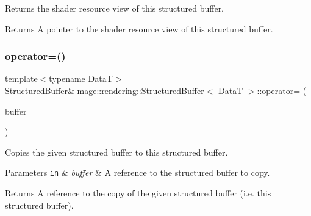 Returns the shader resource view of this structured buffer.

\begin{DoxyReturn}{Returns}
A pointer to the shader resource view of this structured buffer. 
\end{DoxyReturn}
\mbox{\label{classmage_1_1rendering_1_1_structured_buffer_a87a27778bf6097f84b63acc0eef49a3a}} 
\subsubsection{\texorpdfstring{operator=()}{operator=()}\hspace{0.1cm}{\footnotesize\ttfamily [1/2]}}
{\footnotesize\ttfamily template$<$typename DataT$>$ \\
\mbox{\hyperlink{classmage_1_1rendering_1_1_structured_buffer}{Structured\+Buffer}}\& \mbox{\hyperlink{classmage_1_1rendering_1_1_structured_buffer}{mage\+::rendering\+::\+Structured\+Buffer}}$<$ DataT $>$\+::operator= (\begin{DoxyParamCaption}\item[{const \mbox{\hyperlink{classmage_1_1rendering_1_1_structured_buffer}{Structured\+Buffer}}$<$ DataT $>$ \&}]{buffer }\end{DoxyParamCaption})\hspace{0.3cm}{\ttfamily [delete]}}

Copies the given structured buffer to this structured buffer.


\begin{DoxyParams}[1]{Parameters}
\mbox{\tt in}  & {\em buffer} & A reference to the structured buffer to copy. \\
\hline
\end{DoxyParams}
\begin{DoxyReturn}{Returns}
A reference to the copy of the given structured buffer (i.\+e. this structured buffer). 
\end{DoxyReturn}
\mbox{\label{classmage_1_1rendering_1_1_structured_buffer_a488f44cb1e47689e5f7383ae8bdef823}} 

